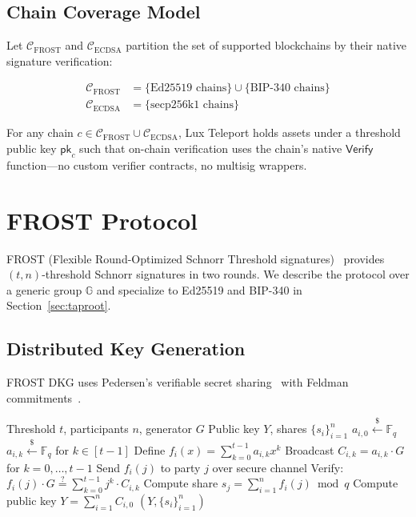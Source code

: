 \documentclass[11pt,twocolumn]{article}
\begin{document}
\subsection{Chain Coverage Model}

Let $\mathcal{C}_{\text{FROST}}$ and $\mathcal{C}_{\text{ECDSA}}$ partition the set
of supported blockchains by their native signature verification:

\begin{align*}
  \mathcal{C}_{\text{FROST}} &= \{\text{Ed25519 chains}\} \cup \{\text{BIP-340 chains}\} \\
  \mathcal{C}_{\text{ECDSA}} &= \{\text{secp256k1 chains}\}
\end{align*}

For any chain $c \in \mathcal{C}_{\text{FROST}} \cup \mathcal{C}_{\text{ECDSA}}$,
Lux Teleport holds assets under a threshold public key $\mathsf{pk}_c$ such that
on-chain verification uses the chain's native $\mathsf{Verify}$ function---no custom
verifier contracts, no multisig wrappers.

\section{FROST Protocol}
\label{sec:frost}

FROST (Flexible Round-Optimized Schnorr Threshold signatures)~\cite{komlo2020frost}
provides $(t,n)$-threshold Schnorr signatures in two rounds. We describe the protocol
over a generic group $\mathbb{G}$ and specialize to Ed25519 and BIP-340 in
Section~\ref{sec:taproot}.

\subsection{Distributed Key Generation}

FROST DKG uses Pedersen's verifiable secret sharing~\cite{pedersen1991} with
Feldman commitments~\cite{feldman1987}.

\begin{algorithm}[H]
\caption{FROST Distributed Key Generation}
\label{alg:frost-dkg}
\begin{algorithmic}[1]
\Require Threshold $t$, participants $n$, generator $G$
\Ensure Public key $Y$, shares $\{s_i\}_{i=1}^n$
  \State $a_{i,0} \xleftarrow{\$} \mathbb{F}_q$ 
  \State $a_{i,k} \xleftarrow{\$} \mathbb{F}_q$ for $k \in [t-1]$
  \State Define $f_i(x) = \sum_{k=0}^{t-1} a_{i,k} x^k$
  \State Broadcast $C_{i,k} = a_{i,k} \cdot G$ for $k = 0, \ldots, t-1$
  \State Send $f_i(j)$ to party $j$ over secure channel
\EndFor
{}
  \State Verify: $f_i(j) \cdot G \stackrel{?}{=} \sum_{k=0}^{t-1} j^k \cdot C_{i,k}$
  \State Compute share $s_j = \sum_{i=1}^n f_i(j) \bmod q$
  \State Compute public key $Y = \sum_{i=1}^n C_{i,0}$
\EndFor
\State \Return $(Y, \{s_i\}_{i=1}^n)$
\end{algorithmic}
\end{algorithm}
\end{document}
